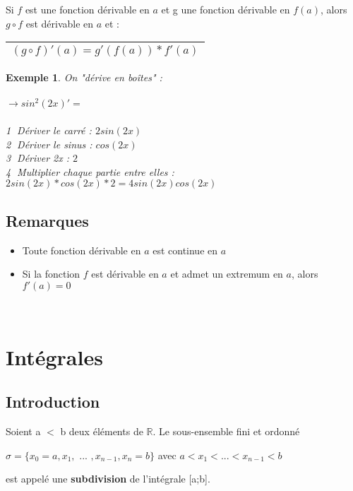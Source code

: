 \documentclass[12pt, a4paper]{book}
\newtheorem*{exemple}{Exemple}
\begin{document}
Si $f$ est une fonction dérivable en $a$ et g une fonction dérivable en $f(a)$, alors $g \circ f$ est dérivable en $a$ et :\\
\begin{center}
    \begin{tabular}{ |c|}
        \hline
        $(g \circ f)'(a) = g'(f(a)) * f'(a)$\\
        \hline
    \end{tabular}
    \end{center}
\begin{exemple}
    On "dérive en boîtes" :\\
    \newline \\
    $\rightarrow sin^{2}(2x)' =$\\
    \newline \\
    \textcircled{1} Dériver le carré : $2sin(2x)$\\
    \textcircled{2} Dériver le sinus : $cos(2x)$\\
    \textcircled{3} Dériver 2x : $2$\\
    \textcircled{4} Multiplier chaque partie entre elles :$2sin(2x)*cos(2x)*2 = 4sin(2x)cos(2x)$\\
\end{exemple}
\subsection{Remarques}
\begin{itemize}
    \item Toute fonction dérivable en $a$ est continue en $a$\\
    \item Si la fonction $f$ est dérivable en $a$ et admet un extremum en $a$, alors $f'(a) = 0$\\
\end{itemize}
\newpage
\ \\
\newpage
\section{Intégrales}
\subsection{Introduction}
Soient a $<$ b deux éléments de $\mathbb{R}$. Le sous-ensemble fini et ordonné
\begin{center}
    $\sigma = \{x_0 = a, x_1,$ ... $,x_{n-1},x_n =b\}$ avec $a < x_1< ... < x_{n-1} < b $
\end{center}
est appelé une \textbf{subdivision} de l'intégrale [a;b].
\end{document}
